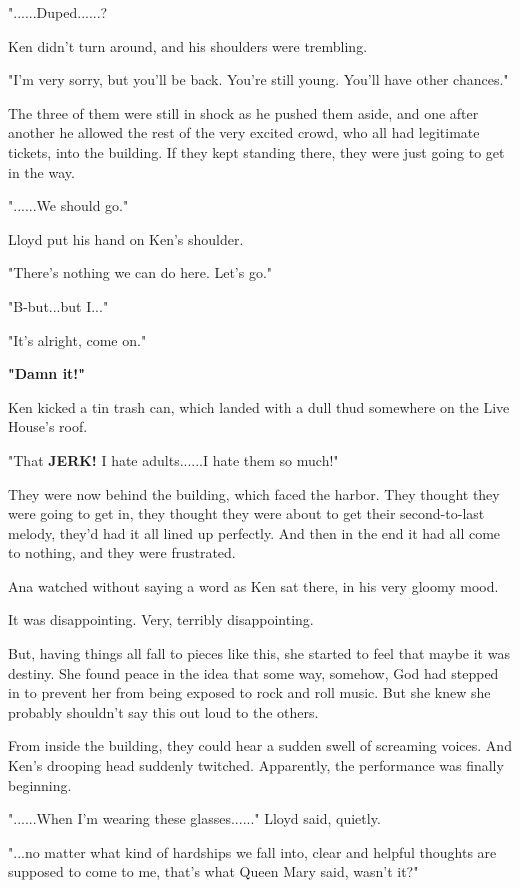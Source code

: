 \documentclass[
]{article}
\begin{document}
"......Duped......?

Ken didn't turn around, and his shoulders were trembling.

"I'm very sorry, but you'll be back. You're still young. You'll have
other chances."

The three of them were still in shock as he pushed them aside, and one
after another he allowed the rest of the very excited crowd, who all had
legitimate tickets, into the building. If they kept standing there, they
were just going to get in the way.

"......We should go."

Lloyd put his hand on Ken's shoulder.

"There's nothing we can do here. Let's go."

"B-but...but I..."

"It's alright, come on."

\textbf{"Damn it!"}

Ken kicked a tin trash can, which landed with a dull thud somewhere on
the Live House's roof.

"That \textbf{JERK!} I hate adults......I hate them so much!"

They were now behind the building, which faced the harbor. They thought
they were going to get in, they thought they were about to get their
second-to-last melody, they'd had it all lined up perfectly. And then in
the end it had all come to nothing, and they were frustrated.

Ana watched without saying a word as Ken sat there, in his very gloomy
mood.

It was disappointing. Very, terribly disappointing.

But, having things all fall to pieces like this, she started to feel
that maybe it was destiny. She found peace in the idea that some way,
somehow, God had stepped in to prevent her from being exposed to rock
and roll music. But she knew she probably shouldn't say this out loud to
the others.

From inside the building, they could hear a sudden swell of screaming
voices. And Ken's drooping head suddenly twitched. Apparently, the
performance was finally beginning.

"......When I'm wearing these glasses......" Lloyd said, quietly.

"...no matter what kind of hardships we fall into, clear and helpful
thoughts are supposed to come to me, that's what Queen Mary said, wasn't
it?"
\end{document}

